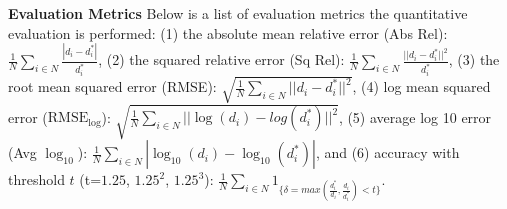 \documentclass[letterpaper]{article} \usepackage{aaai20}  \usepackage{times}  \usepackage{helvet} \usepackage{courier}  \usepackage{graphicx} \frenchspacing  \setlength{\pdfpagewidth}{8.5in}  \setlength{\pdfpageheight}{11in}  \usepackage{epsfig}
\begin{document}
    \textbf{Evaluation Metrics} \hspace{0.3cm} Below is a list of evaluation metrics the quantitative evaluation is performed: 
    (1) the absolute mean relative error (Abs Rel): $\frac{1}{N}\sum_{i \in N}\frac{|d_i - d^*_i|}{d^*_i}$,
    (2) the squared relative error (Sq Rel): $\frac{1}{N}\sum_{i \in N}\frac{||d_i - d^*_i||^2}{d^*_i}$,
    (3) the root mean squared error (RMSE): $\sqrt{\frac{1}{N}\sum_{i \in N}||d_i - d^*_i||^2}$,
    (4) log mean squared error ($\text{RMSE}_{\log}$): $\sqrt{\frac{1}{N}\sum_{i\in N}||\log(d_i) - log(d_i^*)||^2}$, 
    (5) average log 10 error (Avg $\log_{10}$): $\frac{1}{N}\sum_{i \in N}|\log_{10}(d_i) - \log_{10}(d_i^*)|$, and
    (6) accuracy with threshold $t$ (t=$1.25$, $1.25^2$, $1.25^3$): $\frac{1}{N}\sum_{i\in N}1_{\{\delta = max(\frac{d_i^*}{d_i}, \frac{d_i}{d_i^*}) < t\}}$.
    
\end{document}
